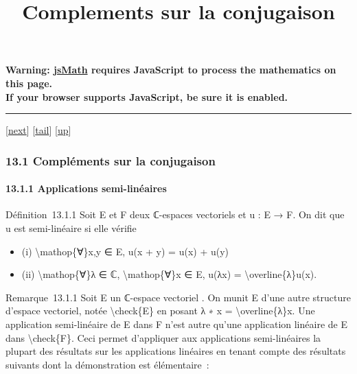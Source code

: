 \documentclass[]{article}
\title{Complements sur la conjugaison}
\author{}
\date{}
\begin{document}
\maketitle

\textbf{Warning: \href{http://www.math.union.edu/locate/jsMath}{jsMath}
requires JavaScript to process the mathematics on this page.\\ If your
browser supports JavaScript, be sure it is enabled.}

\begin{center}\rule{3in}{0.4pt}\end{center}

{[}\href{coursse74.html}{next}{]}
{[}\hyperref[tailcoursse73.html]{tail}{]}
{[}\href{coursch14.html\#coursse73.html}{up}{]}

\subsubsection{13.1 Compléments sur la conjugaison}

\paragraph{13.1.1 Applications semi-linéaires}

Définition~13.1.1 Soit E et F deux ℂ-espaces vectoriels et u : E → F. On
dit que u est semi-linéaire si elle vérifie

\begin{itemize}
\itemsep1pt\parskip0pt
\item
  (i) \textbackslash{}mathop\{∀\}x,y ∈ E, u(x + y) = u(x) + u(y)
\item
  (ii) \textbackslash{}mathop\{∀\}λ ∈ ℂ, \textbackslash{}mathop\{∀\}x ∈
  E, u(λx) = \textbackslash{}overline\{λ\}u(x).
\end{itemize}

Remarque~13.1.1 Soit E un ℂ-espace vectoriel . On munit E d'une autre
structure d'espace vectoriel, notée \textbackslash{}check\{E\} en posant
λ ∗ x = \textbackslash{}overline\{λ\}x. Une application semi-linéaire de
E dans F n'est autre qu'une application linéaire de E dans
\textbackslash{}check\{F\}. Ceci permet d'appliquer aux applications
semi-linéaires la plupart des résultats sur les applications linéaires
en tenant compte des résultats suivants dont la démonstration est
élémentaire~:
\end{document}

